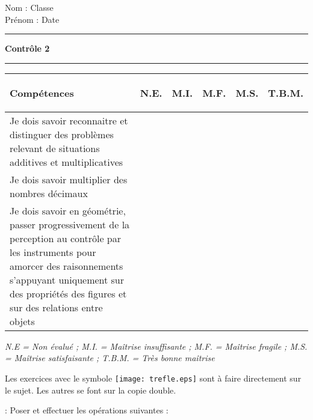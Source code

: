 \documentclass[a4paper,11pt]{article}
\newcounter{numexo}
\newcommand{\exo}[1]{\stepcounter{numexo}\noindent{\bf Exercice~\thenumexo} : \marginpar{\hfill /#1}}
\newcommand{\titre}[5] 
{
\noindent #2 \hfill #4 \\
#3 \hfill #5

\vspace{-1.6cm}

\begin{center}\rule{6cm}{0.5mm}\end{center}
\vspace{0.2cm}
\begin{center}{\large{\textbf{#1}}}\end{center}
\begin{center}\rule{6cm}{0.5mm}\end{center}
}
\begin{document}
\pagestyle{empty}
\titre{Contrôle 2}{Nom :}{Prénom :}{Classe}{Date}


\vspace*{0.5cm}
\begin{flushleft}
\begin{tabular}{|m{9.5cm}|m{1.25cm}|m{1.25cm}|m{1.25cm}|m{1.25cm}|m{1.25cm}|}
\hline 
\textbf{Compétences} & \begin{center}
\textbf{N.E.}
\end{center} & \begin{center}
\textbf{M.I.}
\end{center} & \begin{center}
\textbf{M.F.}
\end{center}  & \begin{center}
\textbf{M.S.}
\end{center} & \begin{center}
\textbf{T.B.M.}
\end{center} \\ 
\hline 
Je dois savoir reconnaitre et distinguer des problèmes relevant de situations additives et multiplicatives &  &  & & &\\
\hline 
Je dois savoir multiplier des nombres décimaux  &  &  & & &\\
\hline
Je dois savoir en géométrie, passer progressivement de la perception au contrôle par les instruments pour amorcer des raisonnements s'appuyant uniquement sur des propriétés des figures et sur des relations entre objets &  &  & & &\\
\hline 



\end{tabular} 
\end{flushleft}

\textit{N.E = Non évalué ; M.I. = Maîtrise insuffisante ; M.F. = Maîtrise fragile ; M.S. = Maîtrise satisfaisante ; T.B.M. = Très bonne maîtrise}\\


\vspace*{0.5cm}



Les exercices avec le symbole \texttt{[image: trefle.eps]}  sont à faire directement sur le sujet. Les autres se font sur la copie double.\\

\vspace*{0.5cm}

\exo{3} Poser et effectuer les opérations suivantes :               
\end{document}

